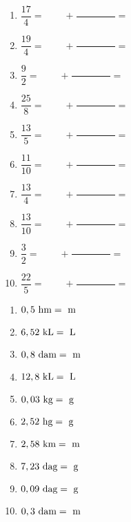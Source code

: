 \documentclass[a4paper,11pt,fleqn]{article}
\begin{document}

\begin{multicols}{2}
\begin{enumerate}[itemsep=2em]
	\item $ \dfrac{17}{4} = \phantom{0000} + \dfrac{\phantom{00000000}}{} =  $
	\item $ \dfrac{19}{4} = \phantom{0000} + \dfrac{\phantom{00000000}}{} =  $
	\item $ \dfrac{9}{2} = \phantom{0000} + \dfrac{\phantom{00000000}}{} =  $
	\item $ \dfrac{25}{8} = \phantom{0000} + \dfrac{\phantom{00000000}}{} =  $
	\item $ \dfrac{13}{5} = \phantom{0000} + \dfrac{\phantom{00000000}}{} =  $
	\item $ \dfrac{11}{10} = \phantom{0000} + \dfrac{\phantom{00000000}}{} =  $
	\item $ \dfrac{13}{4} = \phantom{0000} + \dfrac{\phantom{00000000}}{} =  $
	\item $ \dfrac{13}{10} = \phantom{0000} + \dfrac{\phantom{00000000}}{} =  $
	\item $ \dfrac{3}{2} = \phantom{0000} + \dfrac{\phantom{00000000}}{} =  $
	\item $ \dfrac{22}{5} = \phantom{0000} + \dfrac{\phantom{00000000}}{} =  $
\end{enumerate}
\end{multicols}


\begin{multicols}{2}
\begin{enumerate}[itemsep=2em]
	\item $ 0,5~\text{hm} = \dotfill ~\text{m}$
	\item $ 6,52~\text{kL} = \dotfill ~\text{L}$
	\item $ 0,8~\text{dam} = \dotfill ~\text{m}$
	\item $ 12,8~\text{kL} = \dotfill ~\text{L}$
	\item $ 0,03~\text{kg} = \dotfill ~\text{g}$
	\item $ 2,52~\text{hg} = \dotfill ~\text{g}$
	\item $ 2,58~\text{km} = \dotfill ~\text{m}$
	\item $ 7,23~\text{dag} = \dotfill ~\text{g}$
	\item $ 0,09~\text{dag} = \dotfill ~\text{g}$
	\item $ 0,3~\text{dam} = \dotfill ~\text{m}$
\end{enumerate}
\end{multicols}
\end{document}
